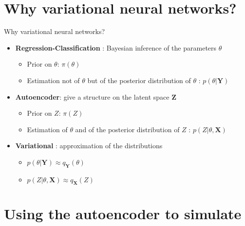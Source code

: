 \documentclass[
  12pt,
  ignorenonframetext,
  compress]{beamer}
\begin{document}
\hypertarget{why-variational-neural-networks}{%
\section{Why variational neural
networks?}\label{why-variational-neural-networks}}

\begin{frame}{Why variational neural networks?}
\begin{itemize}
\item
  \textbf{Regression-Classification} : Bayesian inference of the
  parameters \(\theta\)

  \begin{itemize}
  \item
    Prior on \(\theta\): \(\pi(\theta)\)
  \item
    Estimation not of \(\theta\) but of the posterior distribution of
    \(\theta\) : \(p(\theta | \mathbf{Y})\)
  \end{itemize}
\item
  \textbf{Autoencoder}: give a structure on the latent space
  \(\mathbf{Z}\)

  \begin{itemize}
  \item
    Prior on \(Z\): \(\pi(Z)\)
  \item
    Estimation of \(\theta\) and of the posterior distribution of \(Z\)
    : \(p(Z | \theta, \mathbf{X})\)
  \end{itemize}
\item
  \textbf{Variational} : approximation of the distributions

  \begin{itemize}
  \item
    \(p(\theta | \mathbf{Y}) \approx q_\mathbf{Y}(\theta)\)
  \item
    \(p(Z | \theta, \mathbf{X}) \approx q_\mathbf{X}(Z)\)
  \end{itemize}
\end{itemize}
\end{frame}

\begin{frame}
\end{frame}

\hypertarget{using-the-autoencoder-to-simulate}{%
\section{Using the autoencoder to
simulate}\label{using-the-autoencoder-to-simulate}}
\end{document}
